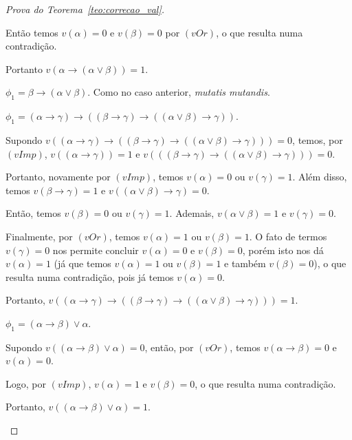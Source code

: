 \begin{proof}[Prova do Teorema~\ref{teo:correcao_val}]
\begin{provaporcasos}
\begin{provaporsubcasos}
                        Então temos $v(\alpha) = 0$ e $v(\beta) = 0$ por $(vOr)$, o que resulta numa contradição. 
                        
                        Portanto $v(\alpha \to (\alpha \lor \beta)) = 1$.
    
                    \subcasodeprova{} $\phi_{1} = \beta \to (\alpha \lor \beta)$. Como no caso anterior, \textit{mutatis mutandis}.
    
                    \subcasodeprova{} $\phi_{1} = (\alpha \to \gamma) \to ((\beta \to \gamma) \to ((\alpha \lor \beta) \to \gamma))$. 
                    
                        Supondo $v((\alpha \to \gamma) \to ((\beta \to \gamma) \to ((\alpha \lor \beta) \to \gamma))) = 0$, temos, por $(vImp)$, $v((\alpha \to \gamma)) = 1$ e $v(((\beta \to \gamma) \to ((\alpha \lor \beta) \to \gamma))) = 0$. 
                        
                        Portanto, novamente por $(vImp)$, temos $v(\alpha) = 0$ ou $v(\gamma) = 1$. Além disso, temos $v(\beta \to \gamma) = 1$ e $v((\alpha \lor \beta) \to \gamma) = 0$. 
                        
                        Então, temos $v(\beta) = 0$ ou $v(\gamma) = 1$. Ademais, $v(\alpha \lor \beta) = 1$ e $v(\gamma) = 0$. 
                        
                        Finalmente, por $(vOr)$, temos $v(\alpha) = 1$ ou $v(\beta) = 1$. O fato de termos $v(\gamma) = 0$ nos permite concluir $v(\alpha) = 0$ e $v(\beta) = 0$, porém isto nos dá $v(\alpha) = 1$ (já que temos $v(\alpha) = 1$ ou $v(\beta) = 1$ e também $v(\beta) = 0$), o que resulta numa contradição, pois já temos $v(\alpha) = 0$. 
                        
                        Portanto, $v((\alpha \to \gamma) \to ((\beta \to \gamma) \to ((\alpha \lor \beta) \to \gamma))) = 1$.
    
                    \subcasodeprova{} $\phi_{1} = (\alpha \to \beta) \lor \alpha$. 
                        
                        Supondo $v((\alpha \to \beta) \lor \alpha) = 0$, então, por $(vOr)$, temos $v(\alpha \to \beta) = 0$ e $v(\alpha) = 0$. 
                        
                        Logo, por $(vImp)$, $v(\alpha) = 1$  e $v(\beta) = 0$, o que resulta numa contradição. 
                        
                        Portanto, $v((\alpha \to \beta) \lor \alpha) = 1$.
    

\end{provaporsubcasos}
\end{provaporcasos}
\end{proof}
